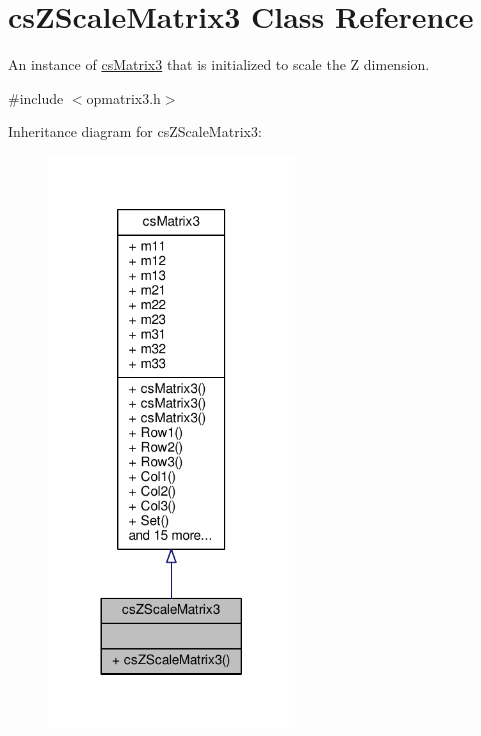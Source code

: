 \hypertarget{classcsZScaleMatrix3}{}\section{cs\+Z\+Scale\+Matrix3 Class Reference}
\label{classcsZScaleMatrix3}


An instance of \hyperlink{classcsMatrix3}{cs\+Matrix3} that is initialized to scale the Z dimension.  




{\ttfamily \#include $<$opmatrix3.\+h$>$}



Inheritance diagram for cs\+Z\+Scale\+Matrix3\+:
\nopagebreak
\begin{figure}[H]
\begin{center}
\leavevmode
\includegraphics[width=185pt]{d4/d59/classcsZScaleMatrix3__inherit__graph}
\end{center}
\end{figure}


